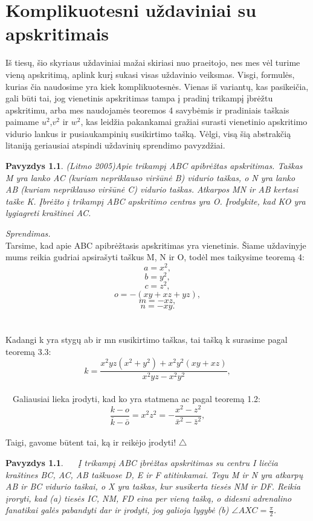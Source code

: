 \documentclass[11pt,a4paper,twoside]{book}
\newenvironment{sprendimas}{\noindent \textit{Sprendimas.}}{\hfill $\triangle$}
\newcounter{foo}[subsection]
\newtheorem{pavnr}[foo]{Pavyzdys}
\theoremstyle{definition} \newtheorem*{api}{Apibrėžimas}
\theoremstyle{remark} \newtheorem*{pastaba}{Pastaba}
\begin{document}
\chapter{Komplikuotesni uždaviniai su apskritimais}

Iš tiesų, šio skyriaus uždaviniai mažai skiriasi nuo praeitojo, nes mes vėl turime vieną apskritimą, aplink kurį sukasi visas uždavinio veiksmas. Visgi, formulės, kurias čia naudosime yra kiek komplikuotesnės. Vienas iš variantų, kas pasikeičia, gali būti tai,  
jog vienetinis apskritimas tampa į pradinį trikampį įbrėžtu apskritimu, arba mes naudojamės
teoremos 4 savybėmis ir pradiniais taškais paimame $u^2$,$v^2$ ir $w^2$, kas leidžia
pakankamai gražiai surasti vienetinio apskritimo vidurio lankus ir pusiaukampinių susikirtimo tašką. Vėlgi, visą šią abstrakčią litaniją geriausiai atspindi uždavinių 
sprendimo pavyzdžiai.

\begin{pavnr}
(Litmo 2005)Apie trikampį ABC apibrėžtas apskritimas. Taškas M yra lanko AC (kuriam nepriklauso 
viršūnė B) vidurio taškas, o N yra lanko AB (kuriam nepriklauso viršūnė C) vidurio taškas. 
Atkarpos MN ir AB kertasi taške K. Įbrėžto į trikampį ABC apskritimo centras yra O. 
Įrodykite, kad KO yra lygiagreti kraštinei AC. 
\end{pavnr}
\begin{sprendimas}
  \\Tarsime, kad apie ABC apibrėžtasis apskritimas yra vienetinis. Šiame uždavinyje mums
reikia gudriai apsirašyti taškus M, N ir O, todėl mes taikysime teoremą 4:
\\
   $$a = x^2,$$
   $$b=y^2,$$
   $$c = z^2,$$
   $$ o = - (xy+xz+yz),$$
   $$m = - xz,$$
   $$ n = - xy.$$
    \\
  \\ Kadangi k yra stygų ab ir mn susikirtimo taškas, tai tašką k surasime pagal teoremą 3.3:
          $$k = \frac{ x^2yz(x^2+y^2)+ x^2 y^2 (xy+xz)}{ x^2 yz - x^2 y^2},$$
  \\ $\phantom{a}$ Galiausiai lieka įrodyti, kad ko yra statmena ac pagal teoremą 1.2:
     $$\frac{k-o}{\bar k - \bar o}  =  x^2 z^2 = - \frac{ x^2 - z^2}{\bar x^2 - \bar z^2},$$
\\ Taigi, gavome būtent tai, ką ir reikėjo įrodyti!
\end{sprendimas}



\begin{pavnr}
  \ $\phantom{a}$  Į trikampį ABC įbrėžtas apskritimas su centru I liečia kraštines BC, AC, AB taškuose D, E ir F atitinkamai.
    Tegu M ir N yra atkarpų AB ir BC vidurio taškai, o X yra taškas, kur susikerta tiesės NM ir DF.
   Reikia įroryti, kad  (a) tiesės IC, NM, FD eina per vieną tašką, o didesni adrenalino fanatikai galės pabandyti dar ir
    įrodyti, jog galioja lygybė (b) $\angle AXC = \frac{\pi}{2}$. 
\end{pavnr}
\end{document}
